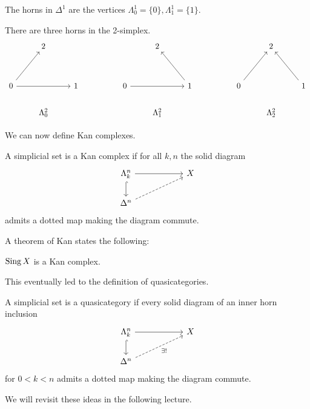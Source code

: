 \begin{example}[1-Horns]
  The horns in $\Delta^{1}$ are the vertices $\Lambda^{1}_{0}=\{0\}, \Lambda^{1}_{1}=\{1\}$. 
\end{example}
\begin{example}[2-Horns]
  There are three horns in the 2-simplex. 
  $$%
  \begin{tikzcd}
    & 2 &&&& 2 & {} &&& 2 \\
    \\
    0 && 1 && 0 && 1 && 0 && 1 \\
    & {\Lambda^{2}_{0}} &&&& {\Lambda^{2}_{1}} &&&& {\Lambda^{2}_{2}}
    \arrow[from=3-1, to=1-2]
    \arrow[from=3-1, to=3-3]
    \arrow[from=3-5, to=3-7]
    \arrow[from=3-7, to=1-6]
    \arrow[from=3-9, to=1-10]
    \arrow[from=3-11, to=1-10]
  \end{tikzcd}$$
\end{example}
We can now define Kan complexes. 
\begin{definition}\label{def: kan complex}
  A simplicial set is a Kan complex if for all $k,n$ the solid diagram
  $$%
  \begin{tikzcd}
    {\Lambda^{n}_{k}} & {} & X \\
    {\Delta^{n}}
    \arrow[from=1-1, to=1-3]
    \arrow[dashed, from=2-1, to=1-3]
    \arrow[hook, from=1-1, to=2-1]
  \end{tikzcd}$$
  admits a dotted map making the diagram commute. 
\end{definition}
A theorem of Kan states the following:
\begin{theorem}[Kan]
  $\operatorname{Sing} X$ is a Kan complex. 
\end{theorem}
This eventually led to the definition of quasicategories. 
\begin{definition}\label{def:quasicategory}
  A simplicial set is a quasicategory if every solid diagram of an inner horn inclusion
  $$%
  \begin{tikzcd}
    {\Lambda^{n}_{k}} & {} & X \\
    {\Delta^{n}}
    \arrow[from=1-1, to=1-3]
    \arrow["{\exists!}"', dashed, from=2-1, to=1-3]
    \arrow[hook, from=1-1, to=2-1]
  \end{tikzcd}$$
  for $0<k<n$ admits a dotted map making the diagram commute. 
\end{definition}
We will revisit these ideas in the following lecture.  